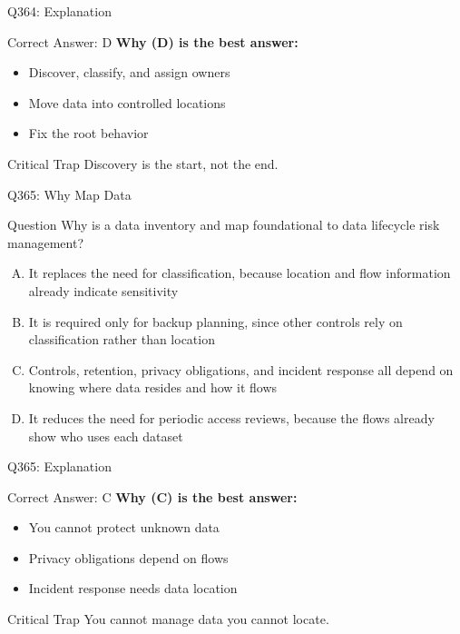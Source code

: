 \documentclass{beamer}
\begin{document}
	\begin{frame}{Q364: Explanation}
		\begin{block}{Correct Answer: D}
			\textbf{Why (D) is the best answer:}
			\begin{itemize}
				\item Discover, classify, and assign owners
				\item Move data into controlled locations
				\item Fix the root behavior
			\end{itemize}
		\end{block}
		\begin{alertblock}{Critical Trap}
			Discovery is the start, not the end.
		\end{alertblock}
	\end{frame}
	
	\begin{frame}{Q365: Why Map Data}
		\begin{block}{Question}
			\small Why is a data inventory and map foundational to data lifecycle risk management?
		\end{block}
		\begin{enumerate}[(A)]
			\footnotesize
			\item It replaces the need for classification, because location and flow information already indicate sensitivity
			\item It is required only for backup planning, since other controls rely on classification rather than location
			\item Controls, retention, privacy obligations, and incident response all depend on knowing where data resides and how it flows
			\item It reduces the need for periodic access reviews, because the flows already show who uses each dataset
		\end{enumerate}
	\end{frame}
	
	\begin{frame}{Q365: Explanation}
		\begin{block}{Correct Answer: C}
			\textbf{Why (C) is the best answer:}
			\begin{itemize}
				\item You cannot protect unknown data
				\item Privacy obligations depend on flows
				\item Incident response needs data location
			\end{itemize}
		\end{block}
		\begin{alertblock}{Critical Trap}
			You cannot manage data you cannot locate.
		\end{alertblock}
	\end{frame}
	
\end{document}

